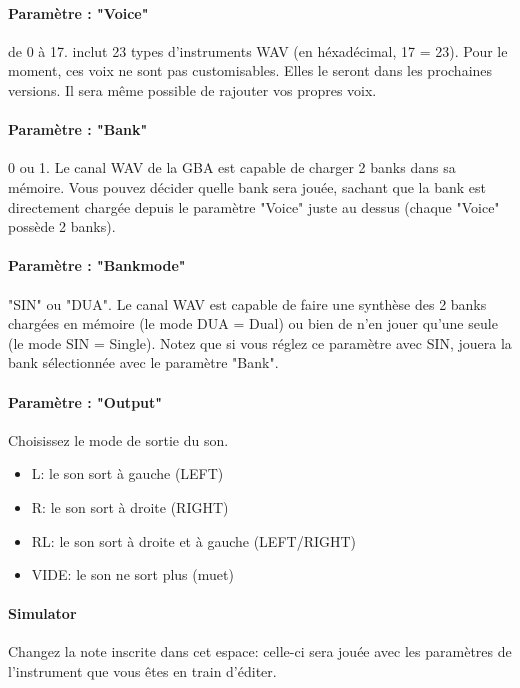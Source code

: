 \documentclass[12pt,a4paper]{article}
\begin{document}
    \paragraph{Paramètre : "Voice"} de 0 à 17.
    \FAT inclut 23 types d'instruments WAV (en héxadécimal, 17 = 23).
    Pour le moment, ces voix ne sont pas customisables.
    Elles le seront dans les prochaines versions.
    Il sera même possible de rajouter vos propres voix.

    \paragraph{Paramètre : "Bank"} 0 ou 1.
    Le canal WAV de la GBA est capable de charger 2 banks dans sa mémoire.
    Vous pouvez décider quelle bank sera jouée,
    sachant que la bank est directement chargée depuis le paramètre "Voice" juste au dessus (chaque "Voice" possède 2 banks).

    \paragraph{Paramètre : "Bankmode"} "SIN" ou "DUA".
    Le canal WAV est capable de faire une synthèse des 2 banks chargées en mémoire (le mode DUA = Dual) ou bien de n'en jouer qu'une seule (le mode SIN = Single).
    Notez que si vous réglez ce paramètre avec SIN, \FAT jouera la bank sélectionnée avec le paramètre "Bank".

    \paragraph{Paramètre : "Output"} Choisissez le mode de sortie du son.
    \medskip

    \begin{itemize}
        \item{L: le son sort à gauche (LEFT)}
        \item{R: le son sort à droite (RIGHT)}
        \item{RL: le son sort à droite et à gauche (LEFT/RIGHT)}
        \item{VIDE: le son ne sort plus (muet)}
    \end{itemize}

    \paragraph{Simulator} Changez la note inscrite dans cet espace:
        celle-ci sera jouée avec les paramètres de l'instrument que vous êtes en train d'éditer.
\end{document}
